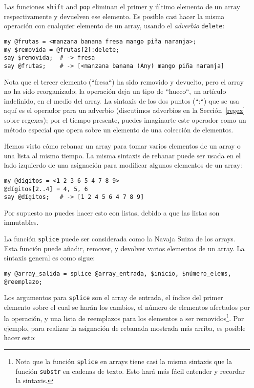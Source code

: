 Las funciones {\tt shift} and {\tt pop} eliminan el primer
y último elemento de un array respectivamente y devuelven
ese elemento. Es posible casi hacer la misma operación
con cualquier elemento de un array, usando el \emph{adverbio}
{\tt delete}:

\begin{verbatim}
my @frutas = <manzana banana fresa mango piña naranja>;
my $removida = @frutas[2]:delete; 
say $removida;  # -> fresa
say @frutas;    # -> [<manzana banana (Any) mango piña naranja]
\end{verbatim}

Nota que el tercer elemento (``fresa``) ha sido removido
y devuelto, pero el array no ha sido reorganizado; la operación
deja un tipo de ``hueco``, un artículo indefinido, en el medio
del array. La sintaxis de los dos puntos (``:``) que se usa aquí es 
el operador para un adverbio (discutimos adverbios en la 
Sección~\ref{regex} sobre regexes); por el tiempo presente, puedes
imaginarte este operador como un método especial que opera sobre un
elemento de una colección de elementos.

Hemos visto cómo rebanar un array para tomar varios elementos de
un array o una lista al mismo tiempo. La misma sintaxis de 
rebanar puede ser usada en el lado izquierdo de una asignación
para modificar algunos elementos de un array:

\begin{verbatim}
my @dígitos = <1 2 3 6 5 4 7 8 9>
@dígitos[2..4] = 4, 5, 6
say @dígitos;   # -> [1 2 4 5 6 4 7 8 9]
\end{verbatim}

Por supuesto no puedes hacer esto con listas, debido a que
las listas son inmutables.

La función {\tt splice} puede ser considerada como la Navaja Suiza
de los arrays. Esta función puede añadir, remover, y devolver varios 
elementos de un array. La sintaxis general es como sigue:

\begin{verbatim}
my @array_salida = splice @array_entrada, $inicio, $número_elems, @reemplazo;
\end{verbatim}
%
Los argumentos para {\tt splice} son el array de entrada, el
índice del primer elemento sobre el cual se harán los cambios,
el número de elementos afectados por la operación, y una lista
de reemplazos para los elementos a ser removidos\footnote{
Nota que la función {\tt splice} en arrays tiene casi la misma
sintaxis que la función {\tt substr} en cadenas de texto. Esto
hará más fácil entender y recordar la sintaxis.}. Por ejemplo, 
para realizar la asignación de rebanada mostrada más arriba, es 
posible hacer esto:

